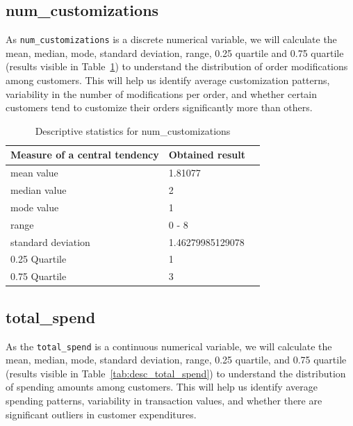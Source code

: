 \documentclass[12pt]{report}
\begin{document}
\subsection{num\_customizations}
\noindent As \texttt{num\_customizations} is a discrete numerical variable, we will calculate the mean, median, mode, standard deviation, range, 0.25 quartile and 0.75 quartile (results visible in Table~\ref{tab:desc_num_customizations}) to understand the distribution of order modifications among customers. This will help us identify average customization patterns, variability in the number of modifications per order, and whether certain customers tend to customize their orders significantly more than others.

\begin{table}[H]
    \centering
    \begin{tabular}{|l|l|l|}
        \hline
        Measure of a central tendency & Obtained result   \\ \hline
        mean value                    & 1.81077           \\ \hline
        median value                  & 2                 \\ \hline
        mode value                    & 1                 \\ \hline
        range                         & 0 - 8             \\ \hline
        standard deviation            & 1.46279985129078  \\ \hline
        0.25 Quartile                 & 1                 \\ \hline
        0.75 Quartile                 & 3                 \\ \hline
    \end{tabular}
    \caption{Descriptive statistics for num\_customizations}\label{tab:desc_num_customizations}
\end{table}

\subsection{total\_spend}
\noindent As the \texttt{total\_spend} is a continuous numerical variable, we will calculate the mean, median, mode, standard deviation, range, 0.25 quartile, and 0.75 quartile (results visible in Table~\ref{tab:desc_total_spend}) to understand the distribution of spending amounts among customers. This will help us identify average spending patterns, variability in transaction values, and whether there are significant outliers in customer expenditures.
\end{document}
